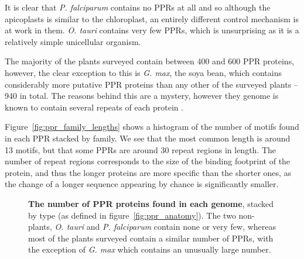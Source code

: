 It is clear that \emph{P. falciparum} contains no PPRs at all and so
although the apicoplasts  is similar to the chloroplast, an entirely
different control mechanism is at work in them.
\emph{O. tauri} contains very few PPRs, which is unsurprising as it is a
relatively simple unicellular organism.

The majority of the plants surveyed contain between 400 and 600 PPR proteins,
however, the clear exception to this is \emph{G. max}, the soya bean, 
which contains considerably more putative PPR proteins than any other of the 
surveyed plants -- 940 in total.
The reasons behind this are a mystery, however they genome is known to contain
several repeats of each protein \citep{Schmutz2010}.

Figure~\ref{fig:ppr_family_lengths} shows a histogram of the number of motifs
found in each PPR stacked by family.
We see that the most common length is around 13 motifs, but that some PPRs are
around 30 repeat regions in length.
The number of repeat regions corresponds to the size of the binding footprint
of the protein, and thus the longer proteins are more specific than the shorter
ones, as the change of a longer sequence appearing by chance is significantly
smaller.


\begin{figure}
  \begin{center}
    \caption{
      \textbf{The number of PPR proteins found in each genome}, 
      stacked by type (as defined in figure~\ref{fig:ppr_anatomy}).
      The two non-plants, \emph{O. tauri} and \emph{P. falciparum} contain none
      or very few, whereas most of the plants surveyed contain a similar number
      of PPRs, with the exception of \emph{G. max} which contains an unusually
      large number.
      \label{fig:ppr_numbers}}
  \end{center}
\end{figure}

